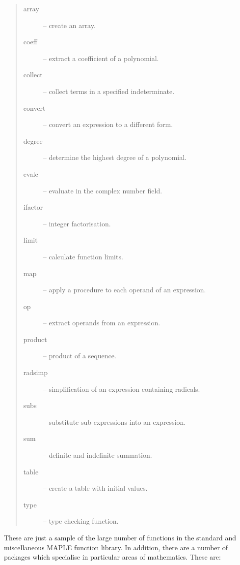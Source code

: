 \documentclass[twoside,11pt]{article}
\begin{document}
\begin{quote}
\begin{description}

\item [array] -- create an array.
\item [coeff] -- extract a coefficient of a polynomial.
\item [collect] -- collect terms in a specified indeterminate.
\item [convert] -- convert an expression to a different form.
\item [degree] -- determine the highest degree of a polynomial.
\item [evalc] -- evaluate in the complex number field.
\item [ifactor] -- integer factorisation.
\item [limit] -- calculate function limits.
\item [map] -- apply a procedure to each operand of an expression.
\item [op] -- extract operands from an expression.
\item [product] -- product of a sequence.
\item [radsimp] -- simplification of an expression containing radicals.
\item [subs] -- substitute sub-expressions into an expression.
\item [sum] -- definite and indefinite summation.
\item [table] -- create a table with initial values.
\item [type] -- type checking function.

\end{description}
\end{quote}

These are just a sample of the large number of functions in the standard and
miscellaneous MAPLE function library. In addition, there are a number of
packages which specialise in particular areas of mathematics. These are:
\end{document}
